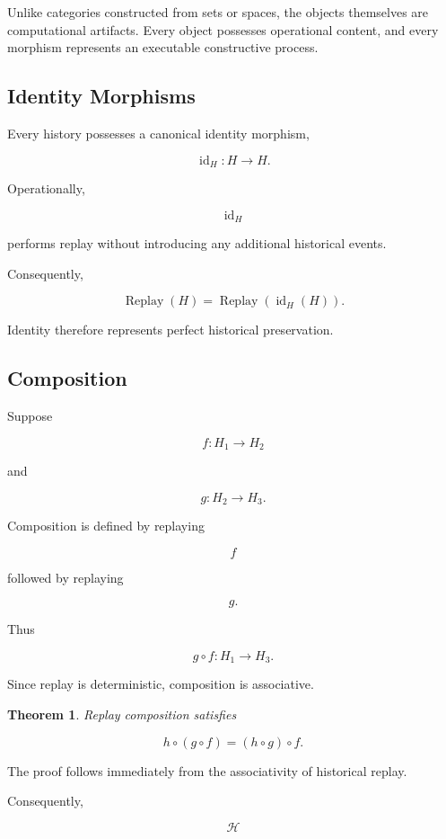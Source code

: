 \documentclass[12pt,oneside]{article}
\newtheorem{theorem}{Theorem}[section]
\theoremstyle{definition}
\theoremstyle{remark}
\DeclareMathOperator{\Replay}{Replay}
\begin{document}
Unlike categories constructed from sets or spaces, the objects themselves are
computational artifacts. Every object possesses operational content, and every
morphism represents an executable constructive process.

\subsection{Identity Morphisms}

Every history possesses a canonical identity morphism,

\[
\operatorname{id}_H
:
H
\rightarrow
H.
\]

Operationally,

\[
\operatorname{id}_H
\]

performs replay without introducing any additional historical events.

Consequently,

\[
\Replay(H)
=
\Replay(\operatorname{id}_H(H)).
\]

Identity therefore represents perfect historical preservation.

\subsection{Composition}

Suppose

\[
f:H_1\rightarrow H_2
\]

and

\[
g:H_2\rightarrow H_3.
\]

Composition is defined by replaying

\[
f
\]

followed by replaying

\[
g.
\]

Thus

\[
g\circ f
:
H_1
\rightarrow
H_3.
\]

Since replay is deterministic, composition is associative.

\begin{theorem}

Replay composition satisfies

\[
h\circ(g\circ f)
=
(h\circ g)\circ f.
\]

\end{theorem}

The proof follows immediately from the associativity of historical replay.

Consequently,

\[
\mathcal H
\]
\end{document}
